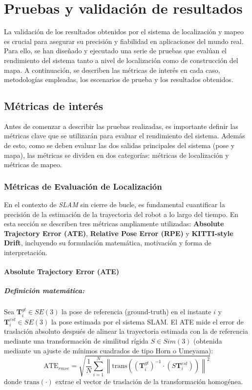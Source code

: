 \documentclass[12pt, a4paper, twoside]{article}
\begin{document}
\section{Pruebas y validación de resultados}
La validación de los resultados obtenidos por el sistema de localización y mapeo es crucial para asegurar su precisión y fiabilidad en aplicaciones del mundo real. Para ello, se han diseñado y 
ejecutado una serie de pruebas que evalúan el rendimiento del sistema tanto a nivel de localización como de construcción del mapa. A continuación, se describen las métricas de interés en cada caso, 
metodologías empleadas, los escenarios de prueba y los resultados obtenidos.

\subsection{Métricas de interés}
Antes de comenzar a describir las pruebas realizadas, es importante definir las métricas clave que se utilizarán para evaluar el rendimiento del sistema. Además de esto, como se deben evaluar las dos 
salidas principales del sistema (pose y mapa), las métricas se dividen en dos categorías: métricas de localización y métricas de mapeo.

\subsubsection{Métricas de Evaluación de Localización}

En el contexto de \textit{SLAM} sin cierre de bucle, es fundamental cuantificar 
la precisión de la estimación de la trayectoria del robot a lo largo del tiempo. 
En esta sección se describen tres métricas ampliamente utilizadas: 
\textbf{Absolute Trajectory Error (ATE\cite{Chen2022DELOATE})}, 
\textbf{Relative Pose Error (RPE\cite{Sturm2012RPE})} y 
\textbf{KITTI-style Drift\cite{Geiger2013KITTI}}, incluyendo su formulación matemática, motivación y forma de interpretación. 
\newpage

\paragraph{Absolute Trajectory Error (ATE\cite{Chen2022DELOATE})}

\subparagraph{Definición matemática:}
Sea $\mathbf{T}^{gt}_i \in SE(3)$ la pose de referencia (ground-truth) en el instante $i$ 
y $\mathbf{T}^{est}_i \in SE(3)$ la pose estimada por el sistema SLAM\cite{smith1987slam}.
El ATE\cite{Chen2022DELOATE} mide el error de traslación absoluto después de alinear la trayectoria estimada 
con la de referencia mediante una transformación de similitud rígida $S \in Sim(3)$
(obtenida mediante un ajuste de mínimos cuadrados de tipo Horn o Umeyama):
\[
\text{ATE}_{rmse} = 
\sqrt{\frac{1}{N}\sum_{i=1}^{N} 
\left\| 
\mathrm{trans}\!\left(
(\mathbf{T}^{gt}_i)^{-1} \cdot (S \mathbf{T}^{est}_i)
\right)
\right\|^2 }
\]
donde $\mathrm{trans}(\cdot)$ extrae el vector de traslación de la transformación homogénea.
\end{document}

